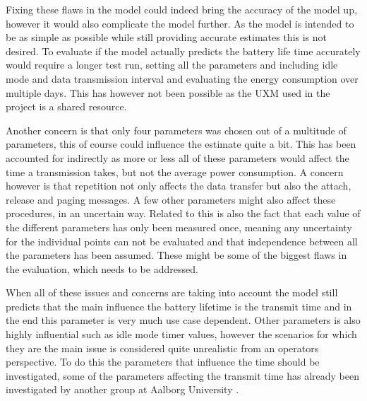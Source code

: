Fixing these flaws in the model could indeed bring the accuracy of the model up, however it would also complicate the model further. As the model is intended to be as simple as possible while still providing accurate estimates this is not desired. To evaluate if the model actually predicts the battery life time accurately would require a longer test run, setting all the parameters and including idle mode and data transmission interval and evaluating the energy consumption over multiple days. This has however not been possible as the UXM used in the project is a shared resource. 

Another concern is that only four parameters was chosen out of a multitude of parameters, this of course could influence the estimate quite a bit. This has been accounted for indirectly as more or less all of these parameters would affect the time a transmission takes, but not the average power consumption. A concern however is that repetition not only affects the data transfer but also the attach, release and paging messages. A few other parameters might also affect these procedures, in an uncertain way. Related to this is also the fact that each value of the different parameters has only been measured once, meaning any uncertainty for the individual points can not be evaluated and that independence between all the parameters has been assumed. These might be some of the biggest flaws in the evaluation, which needs to be addressed.

When all of these issues and concerns are taking into account the model still predicts that the main influence the battery lifetime is the transmit time and in the end this parameter is very much use case dependent. Other parameters is also highly influential such as idle mode timer values, however the scenarios for which they are the main issue is considered quite unrealistic from an operators perspective. To do this the parameters that influence the time should be investigated, some of the parameters affecting the transmit time has already been investigated by another group at Aalborg University \citep{NDS_report}.



